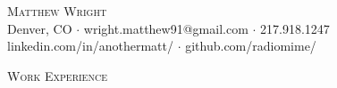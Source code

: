 \documentclass[a4paper]{article}
\newcommand{\lineunder} {
    \vspace*{-8pt} \\
    \hspace*{-18pt} \hrulefill \\
}
\newcommand{\header} [1] {
    {\hspace*{-18pt}\vspace*{6pt} \textsc{#1}}
    \vspace*{-6pt} \lineunder
}
\begin{document}
\vspace*{-40pt}

    


\vspace*{-10pt}
\begin{center}
	{\Huge \scshape {Matthew Wright}}\\
	Denver, CO $\cdot$ wright.matthew91@gmail.com $\cdot$ 217.918.1247\\
  linkedin.com/in/anothermatt/ $\cdot$ github.com/radiomime/\\
\end{center}




\header{Work Experience}
\vspace{1mm}
\end{document}
